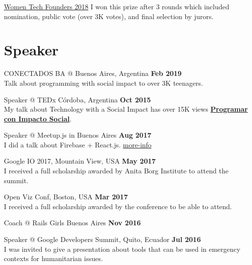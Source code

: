 \documentclass[margin,line]{resume}
\begin{document}
\begin{resume}
\begin{list2}
\item \href{https://womentechfounders.com/2018-award-winners/}{Women Tech Founders 2018} I won this prize after 3 rounds which included nomination, public vote (over 3K votes), and final selection by jurors.
\end{list2}


\section{\mysidestyle Speaker}

\begin{list2}

\item CONECTADOS BA @ Buenos Aires, Argentina \textbf{Feb 2019}  \\
Talk about programming with social impact to over 3K teenagers.

\item Speaker @ TEDx C\'ordoba, Argentina \hfill \textbf{Oct 2015}  \\
My talk about Technology with a Social Impact has over 15K views \href{https://www.youtube.com/watch?v=0cx8UwdN-g4&t=1s}{\textbf{Programar con Impacto Social}}.


\item Speaker @ Meetup.js in Buenos Aires \hfill \textbf{Aug 2017}
\\
I did a talk about Firebase + React.js. \href{https://www.meetup.com/Meetup-js/events/242439836/?eventId=242439836}{more-info}

\item Google IO 2017, Mountain View, USA \hfill \textbf{May 2017}
\\
I received a full scholarship awarded by Anita Borg Institute to attend the summit.


\item Open Viz Conf, Boston, USA \hfill \textbf{Mar 2017}
\\ I received a full scholarship awarded by the conference to be able to attend.

\item Coach  @ Rails Girls Buenos Aires \hfill \textbf{Nov 2016}

\item Speaker @ Google Developers Summit, Quito, Ecuador \hfill \textbf{Jul 2016}  \\
I was invited to give a presentation about tools that can be used in emergency contexts for humanitarian issues.


\end{list2}
\end{resume}
\end{document}
